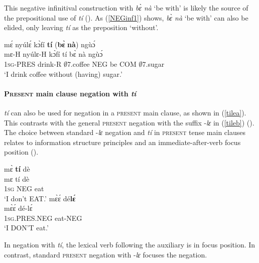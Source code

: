 This negative infinitival construction with {\itshape bɛ̀ nà} `be with'  is likely the source of the prepositional use of {\itshape tí} (). As (\ref{NEGinf1}) shows, {\itshape bɛ̀ nà} `be with' can also be elided, only leaving {\itshape tí} as the preposition `without'.

\begin{exe} 
\ex\label{NEGinf1} 
  \glll  mɛ́ nyúlɛ́ kɔ̀fí {\bfseries tí} ({\bfseries bɛ̀} {\bfseries nà}) ngùɔ́ \\
            mɛ-H nyúlɛ-H kɔ̀fí tí bɛ̀ nà ngùɔ́ \\
         1\textsc{sg}-PRES drink-R $\emptyset$7.coffee NEG be COM $\emptyset$7.sugar \\
    \trans `I drink coffee without (having) sugar.'
\end{exe}









\paragraph{\textsc{Present} main clause negation with {\itshape tí}}
{\itshape tí} can also be used for negation in a \textsc{present} main clause, as shown in (\ref{tilea}). This contrasts with the general \textsc{present} negation with the suffix -{\itshape lɛ} in (\ref{tileb}) ().
The choice between standard -{\itshape lɛ} negation and {\itshape tí} in \textsc{present} tense main clauses relates to information structure principles and an immediate-after-verb focus position ().

\begin{exe}
\ex\label{tile}
\begin{xlist}
\ex\label{tilea}
  \glll  mɛ̀ {\bfseries tí} dè\\
         mɛ tí dè \\
           1\textsc{sg} NEG  eat   \\
    \trans `I don't EAT.'
\ex \label{tileb}
  \glll  mɛ̀ɛ́ dé{\bfseries lɛ́} \\
        mɛ̀ɛ́ dé-lɛ́ \\
         1\textsc{sg}.PRES.NEG eat-NEG    \\
    \trans `I DON'T eat.'
\end{xlist}
\end{exe}

\noindent In negation with {\itshape tí}, the lexical verb following the auxiliary is in focus position. In contrast, standard \textsc{present} negation with -{\itshape lɛ} focuses the negation.


